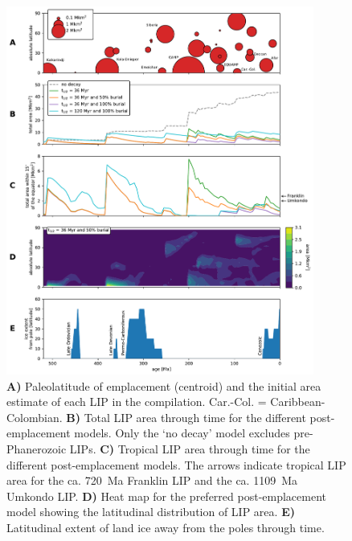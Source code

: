 \documentclass[11pt,letterpaper]{article}
\begin{document}
\begin{figure}[h!]
\begin{center}
	\includegraphics[width=0.9\textwidth]{Manuscript/Figures/LIP_Areas.pdf}
	\caption{\textbf{A)} Paleolatitude of emplacement (centroid) and the initial area estimate of each LIP in the compilation. Car.-Col. = Caribbean-Colombian. \textbf{B)} Total LIP area through time for the different post-emplacement models. Only the `no decay' model excludes pre-Phanerozoic LIPs. \textbf{C)} Tropical LIP area through time for the different post-emplacement models. The arrows indicate tropical LIP area for the ca. 720~Ma Franklin LIP and the ca. 1109~Ma Umkondo LIP. \textbf{D)} Heat map for the preferred post-emplacement model showing the latitudinal distribution of LIP area. \textbf{E)} Latitudinal extent of land ice away from the poles through time.}
	\label{fig:LIP_area}
\end{center}
\end{figure}
\end{document}
